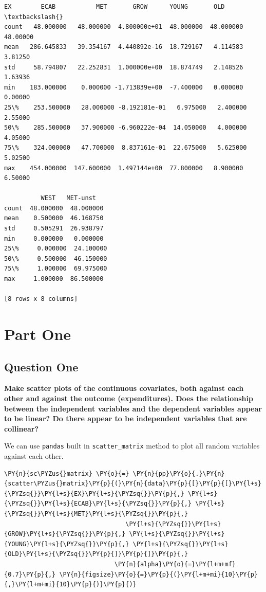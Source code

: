 \documentclass[10pt]{article}\usepackage[]{graphicx}\usepackage[]{xcolor}
\begin{document}
\newpage
            \begin{Verbatim}[commandchars=\\\{\}]
    EX        ECAB           MET       GROW      YOUNG       OLD  \textbackslash{}
count   48.000000   48.000000  4.800000e+01  48.000000  48.000000  48.00000   
mean   286.645833   39.354167  4.440892e-16  18.729167   4.114583   3.81250   
std     58.794807   22.252831  1.000000e+00  18.874749   2.148526   1.63936   
min    183.000000    0.000000 -1.713839e+00  -7.400000   0.000000   0.00000   
25\%    253.500000   28.000000 -8.192181e-01   6.975000   2.400000   2.55000   
50\%    285.500000   37.900000 -6.960222e-04  14.050000   4.000000   4.05000   
75\%    324.000000   47.700000  8.837161e-01  22.675000   5.625000   5.02500   
max    454.000000  147.600000  1.497144e+00  77.800000   8.900000   6.50000   

          WEST   MET-unst  
count  48.000000  48.000000  
mean    0.500000  46.168750  
std     0.505291  26.938797  
min     0.000000   0.000000  
25\%     0.000000  24.100000  
50\%     0.500000  46.150000  
75\%     1.000000  69.975000  
max     1.000000  86.500000  
          
[8 rows x 8 columns]
\end{Verbatim}
        
\newpage

\section*{Part One}
    \subsection*{Question One}
    \textbf{Make scatter plots of the continuous covariates, both against each other and against the outcome
    (expenditures).  Does the relationship between the independent variables and the dependent variables appear to be
    linear? Do there appear to be independent variables that are collinear?}\newline

    We can use \texttt{pandas} built in \texttt{scatter\_matrix} method to plot all random variables against each other.

    \begin{Verbatim}[commandchars=\\\{\}]
\PY{n}{sc\PYZus{}matrix} \PY{o}{=} \PY{n}{pp}\PY{o}{.}\PY{n}{scatter\PYZus{}matrix}\PY{p}{(}\PY{n}{data}\PY{p}{[}\PY{p}{[}\PY{l+s}{\PYZsq{}}\PY{l+s}{EX}\PY{l+s}{\PYZsq{}}\PY{p}{,} \PY{l+s}{\PYZsq{}}\PY{l+s}{ECAB}\PY{l+s}{\PYZsq{}}\PY{p}{,} \PY{l+s}{\PYZsq{}}\PY{l+s}{MET}\PY{l+s}{\PYZsq{}}\PY{p}{,}
                                 \PY{l+s}{\PYZsq{}}\PY{l+s}{GROW}\PY{l+s}{\PYZsq{}}\PY{p}{,} \PY{l+s}{\PYZsq{}}\PY{l+s}{YOUNG}\PY{l+s}{\PYZsq{}}\PY{p}{,} \PY{l+s}{\PYZsq{}}\PY{l+s}{OLD}\PY{l+s}{\PYZsq{}}\PY{p}{]}\PY{p}{]}\PY{p}{,}
                              \PY{n}{alpha}\PY{o}{=}\PY{l+m+mf}{0.7}\PY{p}{,} \PY{n}{figsize}\PY{o}{=}\PY{p}{(}\PY{l+m+mi}{10}\PY{p}{,}\PY{l+m+mi}{10}\PY{p}{)}\PY{p}{)}
    \end{Verbatim}
\end{document}
